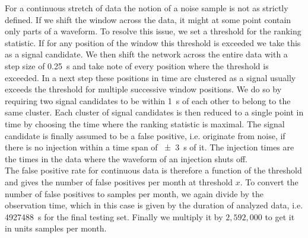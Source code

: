 For a continuous stretch of data the notion of a noise sample is not as strictly defined. If we shift the window across the data, it might at some point contain only parts of a waveform. To resolve this issue, we set a threshold for the ranking statistic. If for any position of the window this threshold is exceeded we take this as a signal candidate. We then shift the network across the entire data with a step size of \SI{0.25}{\s} and take note of every position where the threshold is exceeded. In a next step these positions in time are clustered as a signal usually exceeds the threshold for multiple successive window positions. We do so by requiring two signal candidates to be within \SI{1}{\s} of each other to belong to the same cluster. Each cluster of signal candidates is then reduced to a single point in time by choosing the time where the ranking statistic is maximal. The signal candidate is finally assumed to be a false positive, i.e. originate from noise, if there is no injection within a time span of \SI{\pm 3}{\s} of it. The injection times are the times in the data where the waveform of an injection shuts off.\\
The false positive rate for continuous data is therefore a function of the threshold and gives the number of false positives per month at threshold $x$. To convert the number of false positives to samples per month, we again divide by the observation time, which in this case is given by the duration of analyzed data, i.e. \SI{4927488}{\s} for the final testing set. Finally we multiply it by $2,592,000$ to get it in units samples per month.%

